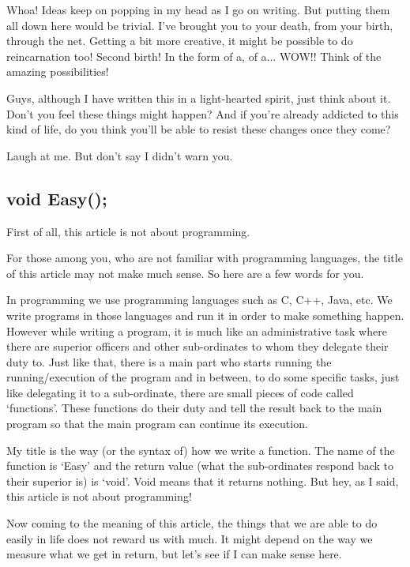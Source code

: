 \documentclass[twoside,11pt,titlepage]{article}
\begin{document}
Whoa! Ideas keep on popping in my head as I go on writing. But putting them all down here would be trivial. I've brought you to your death, from your birth, through the net. Getting a bit more creative, it might be possible to do reincarnation too! Second birth! In the form of a, of a... WOW!! Think of the amazing possibilities!

Guys, although I have written this in a light-hearted spirit, just think about it. Don't you feel these things might happen? And if you're already addicted to this kind of life, do you think you'll be able to resist these changes once they come?

Laugh at me. But don't say I didn't warn you.

\newpage
\begin{center}
  \section{void Easy();}
\end{center}
\bigskip
\bigskip
\bigskip

First of all, this article is not about programming.

For those among you, who are not familiar with programming languages, the title of this article may not make much sense. So here are a few words for you.

In programming we use programming languages such as C, C++, Java, etc. We write programs in those languages and run it in order to make something happen. However while writing a program, it is much like an administrative task where there are superior officers and other sub-ordinates to whom they delegate their duty to. Just like that, there is a main part who starts running the running/execution of the program and in between, to do some specific tasks, just like delegating it to a sub-ordinate, there are small pieces of code called `functions'. These functions do their duty and tell the result back to the main program so that the main program can continue its execution.

My title is the way (or the syntax of) how we write a function. The name of the function is `Easy' and the return value (what the sub-ordinates respond back to their superior is) is `void'. Void means that it returns nothing. But hey, as I said, this article is not about programming!

Now coming to the meaning of this article, the things that we are able to do easily in life does not reward us with much. It might depend on the way we measure what we get in return, but let's see if I can make sense here.
\end{document}
